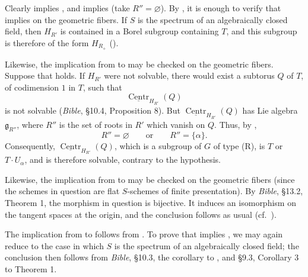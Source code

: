 Clearly \textup{} implies \textup{}, and \textup{}
implies \textup{} \textup{(take \(R''=\varnothing\))}. By ,
it is enough to verify that \textup{} implies \textup{} on
the geometric fibers. If \(S\) is the spectrum of an algebraically
closed field, then \(H_{R'}\) is contained in a Borel subgroup
containing \(T\), and this subgroup is therefore of the form
\(H_{R_+}\) \textup{(\textup{})}.

Likewise, the implication from \textup{} to \textup{} may be
checked on the geometric fibers. Suppose that \textup{} holds.
If \(H_{R'}\) were not solvable, there would exist a subtorus \(Q\)
of \(T\), of codimension \(1\) in \(T\), such that
\[
  \underline{\operatorname{Centr}}_{H_{R'}}(Q)
\]
is not solvable \textup{(\emph{Bible}, \S10.4, Proposition 8)}.
But \(\underline{\operatorname{Centr}}_{H_{R'}}(Q)\) has Lie algebra
\(\mathfrak g_{R''}\), where \(R''\) is the set of roots in \(R'\)
which vanish on \(Q\). Thus, by \textup{},
\[
  R''=\varnothing\qquad\text{or}\qquad R''=\{\alpha\}.
\]
Consequently,
\(\underline{\operatorname{Centr}}_{H_{R'}}(Q)\), which is a subgroup
of \(G\) of type \textup{(R)}, is \(T\) or \(T\cdot U_\alpha\), and
is therefore solvable, contrary to the hypothesis.

Likewise, the implication from \textup{} to \textup{} may be
checked on the geometric fibers \textup{(since the schemes in
question are flat \(S\)-schemes of finite presentation)}. By
\emph{Bible}, \S13.2, Theorem 1\textup{}, the morphism in question
is bijective. It induces an isomorphism on the tangent spaces at the
origin, and the conclusion follows as usual \textup{(cf.\ )}.

The implication from \textup{} to \textup{} follows from
. To prove that \textup{} implies \textup{}, we may again
reduce to the case in which \(S\) is the spectrum of an algebraically
closed field; the conclusion then follows from \emph{Bible}, \S10.3,
the corollary to , and \S9.3, Corollary 3 to Theorem 1.


